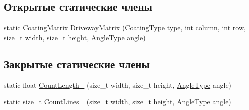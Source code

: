 \subsection*{Открытые статические члены}
\begin{DoxyCompactItemize}
\item 
static \hyperlink{namespacertm_ae3bb29510cfde424975be31866d2486e}{Coating\+Matrix} \hyperlink{classrtm_1_1_driveway_object_ab89dd0516cf883cb0c3332ae0bbc1726}{Driveway\+Matrix} (\hyperlink{namespacertm_aecd3929e64cd461eb3555b611f6fad95}{Coating\+Type} type, int column, int row, size\+\_\+t width, size\+\_\+t height, \hyperlink{namespacertm_a69dc82b16a0148c10962caa83d930f89}{Angle\+Type} angle)
\end{DoxyCompactItemize}
\subsection*{Закрытые статические члены}
\begin{DoxyCompactItemize}
\item 
static float \hyperlink{classrtm_1_1_driveway_object_a6ebdc5c00005dbc2e96243767ba33273}{Count\+Length\+\_\+} (size\+\_\+t width, size\+\_\+t height, \hyperlink{namespacertm_a69dc82b16a0148c10962caa83d930f89}{Angle\+Type} angle)
\item 
static size\+\_\+t \hyperlink{classrtm_1_1_driveway_object_af8a26a955200fde09d68d606a68c5f8c}{Count\+Lines\+\_\+} (size\+\_\+t width, size\+\_\+t height, \hyperlink{namespacertm_a69dc82b16a0148c10962caa83d930f89}{Angle\+Type} angle)
\end{DoxyCompactItemize}

